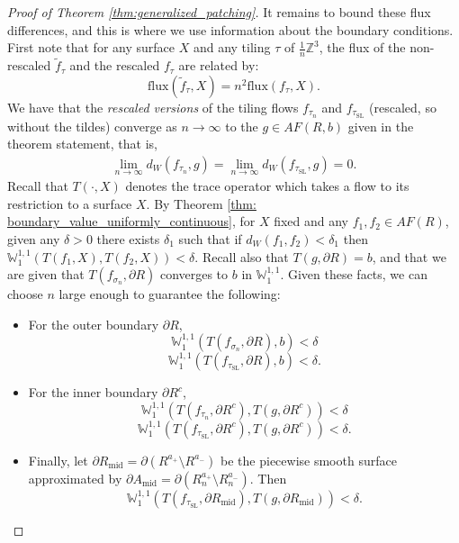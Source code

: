 \documentclass[11pt]{article}
\theoremstyle{remark}
\theoremstyle{definition}
\newcommand{\m}[1]{\mathbb{#1}}
\begin{document}
\begin{proof}[Proof of Theorem \ref{thm:generalized_patching}]
    It remains to bound these flux differences, and this is where we use information about the boundary conditions. First note that for any surface $X$ and any tiling $\tau$ of $\frac{1}{n}\m Z^3$, the flux of the non-rescaled $\widetilde f_\tau$ and the rescaled $f_\tau$ are related by:
    \begin{equation}\label{eq:differ_by_n2}
        \text{flux}(\widetilde f_\tau,X) = n^2 \text{flux}(f_\tau,X).  
    \end{equation}
    We have that the \textit{rescaled versions} of the tiling flows $f_{\tau_n}$ and $f_{\tau_{\text{SL}}}$ (rescaled, so without the tildes) converge as $n\to \infty$ to the $g\in AF(R,b)$ given in the theorem statement, that is, 
    \begin{align*}
        \lim_{n\to \infty} d_W( f_{\tau_n},g) = \lim_{n\to \infty}d_W( f_{\tau_{\text{SL}}}, g) =0.
    \end{align*}
    Recall that $T(\cdot, X)$ denotes the trace operator which takes a flow to its restriction to a surface $X$. By Theorem \ref{thm: boundary_value_uniformly_continuous}, for $X$ fixed and any $f_1,f_2\in AF(R)$, given any $\delta>0$ there exists $\delta_1$ such that if $d_W(f_1,f_2)< \delta_1$ then $\m W_1^{1,1}(T(f_1,X),T(f_2,X))<\delta$. Recall also that $T(g,\partial R) = b$, and that we are given that $T(f_{\sigma_n},\partial R)$ converges to $b$ in $\m W_1^{1,1}$. Given these facts, we can choose $n$ large enough to guarantee the following: 
    \begin{itemize}
        \item For the outer boundary $\partial R$, 
        \begin{equation}\label{eq:bound1}
        \m W_1^{1,1}(T( f_{\sigma_n},\partial R), b) < \delta
        \end{equation}
        \begin{equation}\label{eq:bound2}
            \m W_1^{1,1}(T( f_{\tau_{\text{SL}}},\partial R), b) < \delta.
        \end{equation}
        \item For the inner boundary $\partial R^c$,
        \begin{equation}\label{eq:bound3}
            \m W_1^{1,1}(T( f_{\tau_n},\partial R^c),T(g,\partial R^c))<\delta
        \end{equation}
        \begin{equation}\label{eq:bound4}
            \m W_1^{1,1}(T( f_{\tau_{\text{SL}}},\partial R^c),T(g,\partial R^c))<\delta.
        \end{equation}
        \item Finally, let $\partial R_{\text{mid}}=\partial (R^{a_+}\setminus R^{a_-})$ be the piecewise smooth surface approximated by $\partial A_{\text{mid}}= \partial(R_n^{a_+}\setminus R_n^{a_-})$. Then  
        \begin{equation}\label{eq:bound5}
            \m W_1^{1,1}(T( f_{\tau_{\text{SL}}},\partial R_{\text{mid}}),T(g,\partial R_{\text{mid}}))<\delta.
        \end{equation}
    \end{itemize}   


\end{proof}
\end{document}
